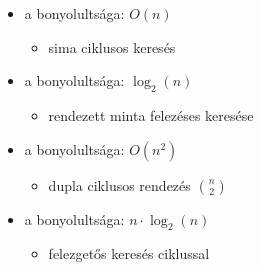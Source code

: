 \documentclass[main.tex]{subfiles}
\begin{document}
  \begin{itemize}
    \item a  bonyolultsága: $O(n)$
    \begin{itemize}
      \item sima  ciklusos keresés
    \end{itemize}

    \item a  bonyolultsága: $\log_2(n)$
    \begin{itemize}
      \item rendezett minta felezéses keresése
    \end{itemize}
  \end{itemize}

  \begin{itemize}
    \item a  bonyolultsága: $O(n^2)$
    \begin{itemize}
      \item dupla  ciklusos rendezés $\binom{n}{2}$
    \end{itemize}

    \item a  bonyolultsága: $n \cdot \log_2(n)$
    \begin{itemize}
      \item felezgetős keresés  ciklussal
    \end{itemize}
  \end{itemize}
\end{document}
